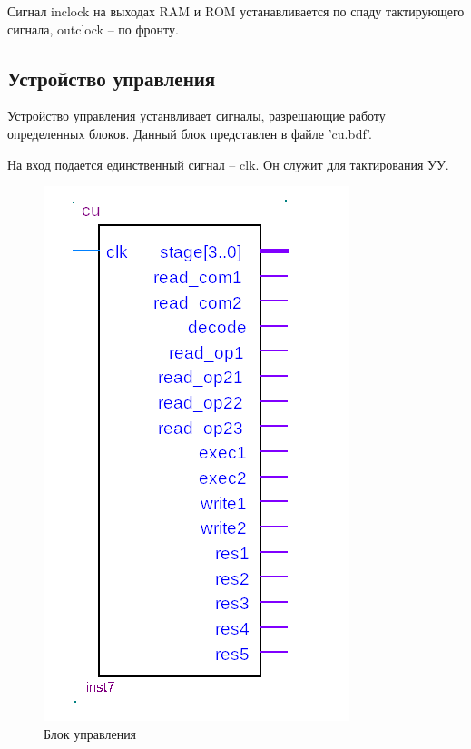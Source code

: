 Сигнал inclock на выходах RAM и ROM устанавливается по спаду тактирующего сигнала, outclock -- по фронту.

\subsection{Устройство управления}
Устройство управления устанвливает сигналы, разрешающие работу определенных блоков.
Данный блок представлен в файле 'cu.bdf'.

На вход подается единственный сигнал -- clk. Он служит для тактирования УУ.

\begin{figure}[ht]
\centering
    \includegraphics[scale=0.8]{cub}
    \caption{Блок управления}
\end{figure}

